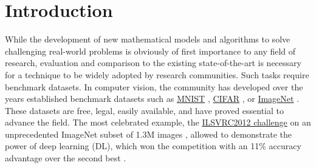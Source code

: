 \documentclass{article}
\begin{document}
\section{Introduction} %


While the development of new mathematical models and algorithms to solve challenging real-world problems is obviously of first importance to any field of research, evaluation and comparison to the existing state-of-the-art is necessary for a technique to be widely adopted by research communities. Such tasks require benchmark datasets. %
In computer vision, the community has developed over the years established benchmark datasets such as \href{http://yann.lecun.com/exdb/mnist/}{MNIST} \cite{mnist}, \href{https://www.cs.toronto.edu/~kriz/cifar.html}{CIFAR} \cite{cifar}, or \href{http://www.image-net.org}{ImageNet} \cite{imagenet}. These datasets are free, legal, easily available, and have proved essential to advance the field. The most celebrated example, the \href{http://www.image-net.org/challenges/LSVRC/2012/}{ILSVRC2012 challenge} on an unprecedented ImageNet subset of 1.3M images \cite{imagenet_challenge}, allowed to demonstrate the power of deep learning (DL), which won the competition with an 11\% accuracy advantage over the second best \cite{convnet_imagenet}.
\end{document}
